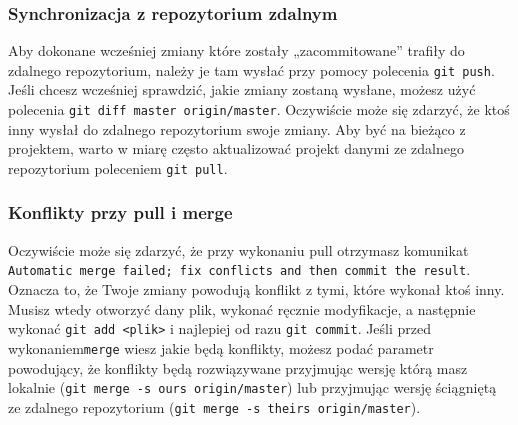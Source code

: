 \subsubsection{Synchronizacja z repozytorium zdalnym}
Aby dokonane wcześniej zmiany które zostały „zacommitowane” trafiły do zdalnego repozytorium, należy je tam wysłać przy pomocy polecenia \verb|git push|. Jeśli chcesz wcześniej sprawdzić, jakie zmiany zostaną wysłane, możesz użyć polecenia \texttt{git diff master origin/master}.
Oczywiście może się zdarzyć, że ktoś inny wysłał do zdalnego repozytorium swoje zmiany. Aby być na bieżąco z projektem, warto w miarę często aktualizować projekt danymi ze zdalnego repozytorium poleceniem \verb|git pull|.

\subsubsection{Konflikty przy pull i merge}
Oczywiście może się zdarzyć, że przy wykonaniu pull otrzymasz komunikat \texttt{Automatic merge failed; fix conflicts and then commit the result}. Oznacza to, że Twoje zmiany powodują konflikt z tymi, które wykonał ktoś inny. Musisz wtedy otworzyć dany plik, wykonać ręcznie modyfikacje, a następnie wykonać \verb|git add <plik>| i najlepiej od razu \verb|git commit|.
Jeśli przed wykonaniem\verb|merge| wiesz jakie będą konflikty, możesz podać parametr powodujący, że konflikty będą rozwiązywane przyjmując wersję którą masz lokalnie (\texttt{git merge -s ours origin/master}) lub przyjmując wersję ściągniętą ze zdalnego repozytorium (\texttt{git merge -s theirs origin/master}).